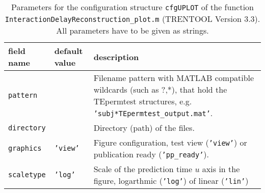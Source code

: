 \begin{table}[H]
\small \centering
\caption[Parameters \texttt{cfgUPLOT}]{Parameters for the configuration structure \texttt{cfgUPLOT} of the function \texttt{InteractionDelayReconstruction\_plot.m} (TRENTOOL Version 3.3). All parameters have to be given as strings.} 
\begin{tabularx}{\textwidth}{p{2cm}p{2cm}X} \toprule
\textbf{field name} & \textbf{default value} & \textbf{description} \\ \midrule
\verb+pattern+ & & Filename pattern with MATLAB compatible wildcards (such as ?,*), that hold the TEpermtest structures, e.g. \texttt{'subj*TEpermtest\_output.mat'}.\\
\rowcolor{Gray}
\verb+directory+ & & Directory (path) of the files.\\
\verb+graphics+ & \texttt{'view'} & Figure configuration, test view (\texttt{'view'}) or publication ready (\texttt{'pp\_ready'}).\\
\rowcolor{Gray}
\verb+scaletype+ & \texttt{'log'} & Scale of the prediction time $u$ axis in the figure, logarthmic (\texttt{'log'}) of linear (\texttt{'lin'})\\ \bottomrule
\end{tabularx} \label{tab:cfgUPLOT}
\end{table}